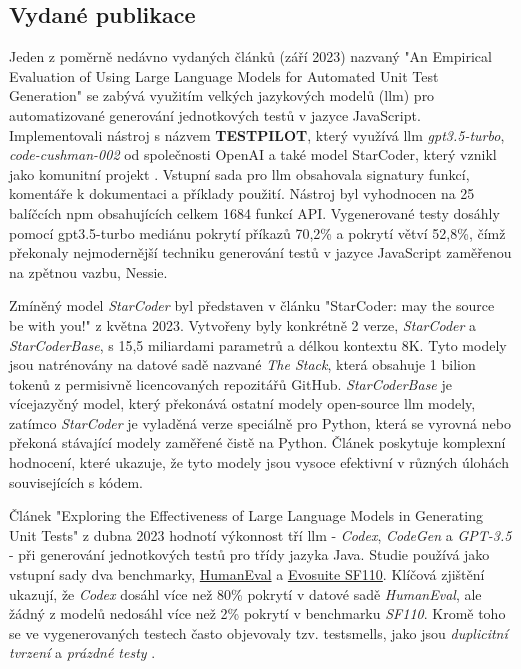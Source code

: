 \documentclass[12pt]{article}
\begin{document}
        \subsection{Vydané publikace}
        Jeden z poměrně nedávno vydaných článků (září 2023) nazvaný "An Empirical Evaluation of Using Large Language Models for Automated Unit Test Generation" \cite{schafer2023empirical} se zabývá využitím velkých jazykových modelů (\gls{llm}) pro automatizované generování jednotkových testů v jazyce JavaScript. Implementovali nástroj s názvem \textbf{TESTPILOT}, který využívá \gls{llm} \textit{gpt3.5-turbo}, \textit{code-cushman-002} od společnosti OpenAI a  také model StarCoder, který vznikl jako komunitní projekt \cite{StarCoder2023}. Vstupní sada pro \gls{llm} obsahovala signatury funkcí, komentáře k dokumentaci a příklady použití. Nástroj byl vyhodnocen na 25 balíčcích npm obsahujících celkem 1684 funkcí API. Vygenerované testy dosáhly pomocí gpt3.5-turbo mediánu pokrytí příkazů 70,2\% a pokrytí větví 52,8\%, čímž překonaly nejmodernější techniku generování testů v jazyce JavaScript zaměřenou na zpětnou vazbu, Nessie.

        Zmíněný model \emph{StarCoder} byl představen v článku "StarCoder: may the source be with you!" \cite{StarCoder2023} z května 2023. Vytvořeny byly konkrétně 2 verze, \textit{StarCoder} a \textit{StarCoderBase}, s 15,5 miliardami parametrů a délkou kontextu 8K. Tyto modely jsou natrénovány na datové sadě nazvané \textit{The Stack}, která obsahuje 1 bilion tokenů z permisivně licencovaných repozitářů GitHub. \textit{StarCoderBase} je vícejazyčný model, který překonává ostatní modely open-source \gls{llm} modely, zatímco \textit{StarCoder} je vyladěná verze speciálně pro Python, která se vyrovná nebo překoná stávající modely zaměřené čistě na Python. Článek poskytuje komplexní hodnocení, které ukazuje, že tyto modely jsou vysoce efektivní v různých úlohách souvisejících s kódem.

        Článek "Exploring the Effectiveness of Large Language Models in Generating Unit Tests" \cite{siddiq2023exploring} z dubna 2023 hodnotí výkonnost tří \gls{llm} - \textit{Codex}, \textit{CodeGen} a \textit{GPT-3.5} - při generování jednotkových testů pro třídy jazyka Java. Studie používá jako vstupní sady dva benchmarky, \href{https://paperswithcode.com/dataset/humaneval-x}{HumanEval} a \href{https://paperswithcode.com/dataset/evosuite-sf110-benchmark}{Evosuite SF110}. Klíčová zjištění ukazují, že \textit{Codex} dosáhl více než 80\% pokrytí v datové sadě \textit{HumanEval}, ale žádný z modelů nedosáhl více než 2\% pokrytí v benchmarku \textit{SF110}. Kromě toho se ve vygenerovaných testech často objevovaly tzv. \gls{testsmells}, jako jsou \textit{duplicitní tvrzení} a \textit{prázdné testy} \cite{testsmells}.
\end{document}
